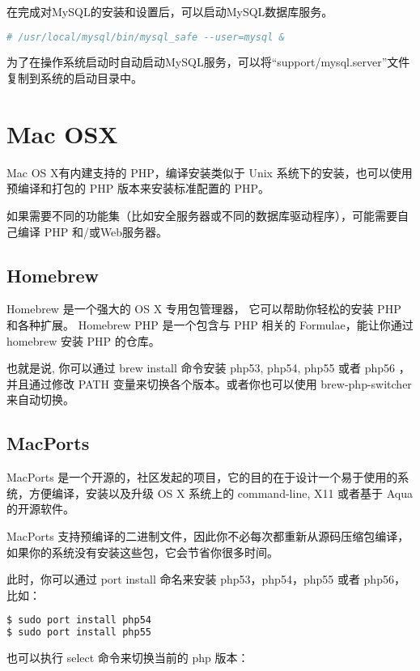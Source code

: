 在完成对MySQL的安装和设置后，可以启动MySQL数据库服务。

\begin{lstlisting}[language=bash]
# /usr/local/mysql/bin/mysql_safe --user=mysql &
\end{lstlisting}

为了在操作系统启动时自动启动MySQL服务，可以将“support/mysql.server”文件复制到系统的启动目录中。


\section{Mac OSX}

Mac OS X有内建支持的 PHP，编译安装类似于 Unix 系统下的安装，也可以使用预编译和打包的 PHP 版本来安装标准配置的 PHP。

如果需要不同的功能集（比如安全服务器或不同的数据库驱动程序），可能需要自己编译 PHP 和/或Web服务器。

\subsection{Homebrew}

Homebrew 是一个强大的 OS X 专用包管理器， 它可以帮助你轻松的安装 PHP 和各种扩展。 Homebrew PHP 是一个包含与 PHP 相关的 Formulae，能让你通过 homebrew 安装 PHP 的仓库。

也就是说, 你可以通过 brew install 命令安装 php53, php54, php55 或者 php56 ，并且通过修改 PATH 变量来切换各个版本。或者你也可以使用 brew-php-switcher 来自动切换。

\subsection{MacPorts}

MacPorts 是一个开源的，社区发起的项目，它的目的在于设计一个易于使用的系统，方便编译，安装以及升级 OS X 系统上的 command-line, X11 或者基于 Aqua 的开源软件。

MacPorts 支持预编译的二进制文件，因此你不必每次都重新从源码压缩包编译，如果你的系统没有安装这些包，它会节省你很多时间。

此时，你可以通过 port install 命名来安装 php53，php54，php55 或者 php56，比如：

\begin{lstlisting}[language=bash]
$ sudo port install php54
$ sudo port install php55
\end{lstlisting}

也可以执行 select 命令来切换当前的 php 版本：


